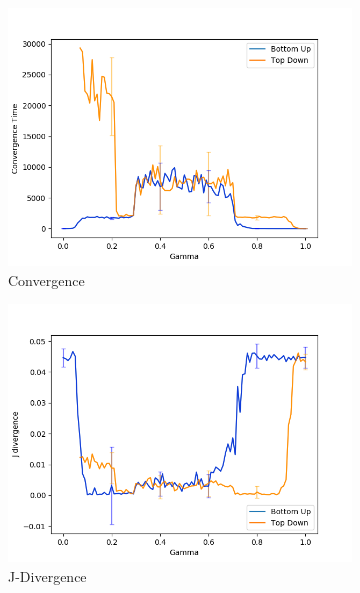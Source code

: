 \begin{figure}[h!]
 \centering
  \begin{subfigure}[ht]{0.45\textwidth}
    \includegraphics[width=\textwidth]{Images/Figures/BU+TD/None/Convergence_best.png}
    \caption{Convergence}\label{fig:convergence}
 \end{subfigure}
 \hfill
 \begin{subfigure}[ht]{0.45\textwidth}
    \includegraphics[width=\textwidth]{Images/Figures/BU+TD/None/J-Div_best.png}
    \caption{J-Divergence}\label{fig:J-Div_convergence}
 \end{subfigure}
 \hfill
 \begin{subfigure}[ht]{0.45\textwidth}

\end{subfigure}
\end{figure}
